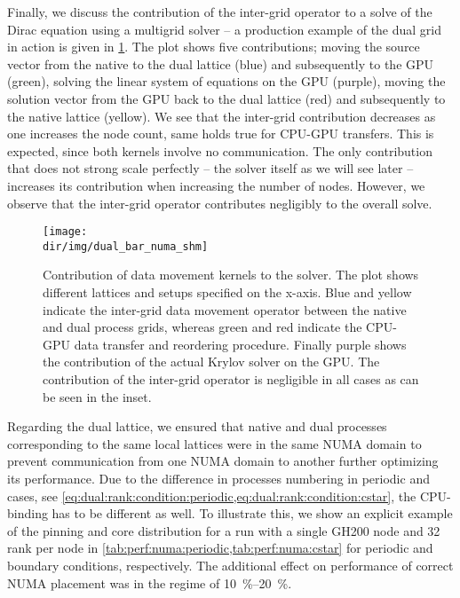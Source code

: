 Finally, we discuss the contribution of the inter-grid operator to a solve of the Dirac equation using a multigrid solver -- a production example of the dual grid in action is given in \cref{fig:dual:bar}.
The plot shows five contributions; moving the source vector from the native to the dual lattice (blue) and subsequently to the GPU (green), solving the linear system of equations on the GPU (purple), moving the solution vector from the GPU back to the dual lattice (red) and subsequently to the native lattice (yellow).
We see that the inter-grid contribution decreases as one increases the node count, same holds true for CPU-GPU transfers.
This is expected, since both kernels involve no communication.
The only contribution that does not strong scale perfectly -- the solver itself as we will see later -- increases its contribution when increasing the number of nodes.
However, we observe that the inter-grid operator contributes negligibly to the overall solve.
\begin{figure}
    \centering
    \texttt{[image: \\dir/img/dual\_bar\_numa\_shm]}
    \caption{Contribution of data movement kernels to the solver. The plot shows different lattices and setups specified on the x-axis. Blue and yellow indicate the inter-grid data movement operator between the native and dual process grids, whereas green and red indicate the CPU-GPU data transfer and reordering procedure. Finally purple shows the contribution of the actual Krylov solver on the GPU. The contribution of the inter-grid operator is negligible in all cases as can be seen in the inset. }
    \label{fig:dual:bar}
\end{figure}

Regarding the dual lattice, we ensured that native and dual processes corresponding to the same local lattices were in the same NUMA domain to prevent communication from one NUMA domain to another further optimizing its performance.
Due to the difference in processes numbering in periodic and \Cstar cases, see \cref{eq:dual:rank:condition:periodic,eq:dual:rank:condition:cstar}, the CPU-binding has to be different as well.
To illustrate this, we show an explicit example of the pinning and core distribution for a run with a single GH200 node and \num{32} rank per node in \cref{tab:perf:numa:periodic,tab:perf:numa:cstar} for periodic and \Cstar boundary conditions, respectively.
The additional effect on performance of correct NUMA placement was in the regime of \SIrange{10}{20}{\percent}.

